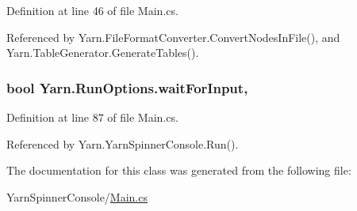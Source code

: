 Definition at line 46 of file Main.\-cs.



Referenced by Yarn.\-File\-Format\-Converter.\-Convert\-Nodes\-In\-File(), and Yarn.\-Table\-Generator.\-Generate\-Tables().

\hypertarget{a00157_a4b385e83338d14947c4d840d2d1ee266}{
\subsubsection[{wait\-For\-Input}]{\setlength{\rightskip}{0pt plus 5cm}bool Yarn.\-Run\-Options.\-wait\-For\-Input\hspace{0.3cm}{\ttfamily [get]}, {\ttfamily [set]}}}\label{a00157_a4b385e83338d14947c4d840d2d1ee266}


Definition at line 87 of file Main.\-cs.



Referenced by Yarn.\-Yarn\-Spinner\-Console.\-Run().



The documentation for this class was generated from the following file\-:\begin{DoxyCompactItemize}
\item 
Yarn\-Spinner\-Console/\hyperlink{a00325}{Main.\-cs}\end{DoxyCompactItemize}
